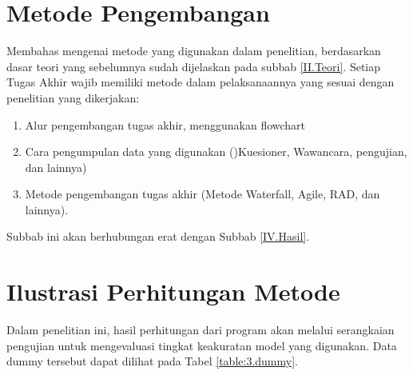\section{Metode Pengembangan} \label{III.Metode}
Membahas mengenai metode yang digunakan dalam penelitian, berdasarkan dasar teori yang sebelumnya sudah dijelaskan pada subbab \ref{II.Teori}. Setiap Tugas Akhir wajib memiliki metode dalam pelaksanaannya yang sesuai dengan penelitian yang dikerjakan: \par
\begin{enumerate}[noitemsep]
	\item Alur pengembangan tugas akhir, menggunakan flowchart
	\item Cara pengumpulan data yang digunakan ()Kuesioner, Wawancara, pengujian, dan lainnya)
	\item Metode pengembangan tugas akhir (Metode Waterfall, Agile, RAD, dan lainnya).
\end{enumerate}
Subbab ini akan berhubungan erat dengan Subbab \ref{IV.Hasil}. \par

\section{Ilustrasi Perhitungan Metode} \label{III.Ilustrasi}
Dalam penelitian ini, hasil perhitungan dari program akan melalui serangkaian pengujian untuk mengevaluasi tingkat keakuratan model yang digunakan. Data dummy tersebut dapat dilihat pada Tabel \ref{table:3.dummy}. \par


